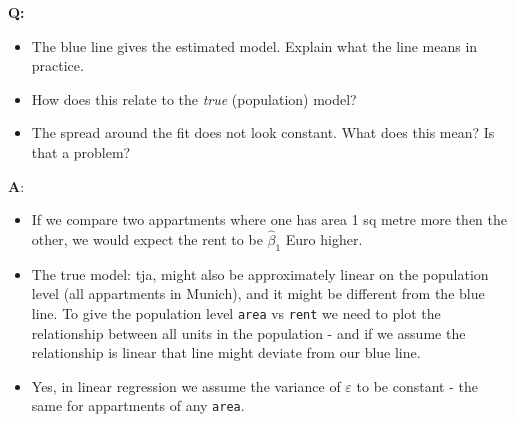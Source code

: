 \documentclass[ignorenonframetext,]{beamer}
\providecommand{\tightlist}{%
  \setlength{\itemsep}{0pt}\setlength{\parskip}{0pt}}
\begin{document}
\begin{frame}

\textbf{Q:}

\begin{itemize}
\tightlist
\item
  The blue line gives the estimated model. Explain what the line means
  in practice.
\item
  How does this relate to the \emph{true} (population) model?
\item
  The spread around the fit does not look constant. What does this mean?
  Is that a problem?
\end{itemize}

\end{frame}

\begin{frame}[fragile]

\textbf{A}:

\begin{itemize}
\tightlist
\item
  If we compare two appartments where one has area 1 sq metre more then
  the other, we would expect the rent to be \(\hat{\beta}_1\) Euro
  higher.
\item
  The true model: tja, might also be approximately linear on the
  population level (all appartments in Munich), and it might be
  different from the blue line. To give the population level
  \texttt{area} vs \texttt{rent} we need to plot the relationship
  between all units in the population - and if we assume the
  relationship is linear that line might deviate from our blue line.
\item
  Yes, in linear regression we assume the variance of \(\varepsilon\) to
  be constant - the same for appartments of any \texttt{area}.
\end{itemize}

\end{frame}
\end{document}
